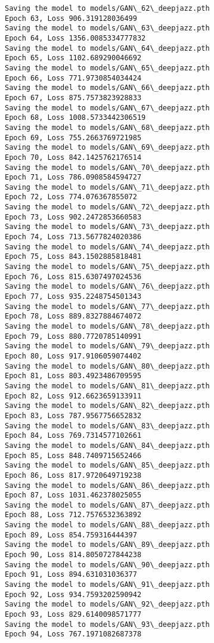 \documentclass[11pt]{article}
\begin{document}
\begin{Verbatim}[commandchars=\\\{\}]
Saving the model to models/GAN\_62\_deepjazz.pth
Epoch 63, Loss 906.319128036499
Saving the model to models/GAN\_63\_deepjazz.pth
Epoch 64, Loss 1356.0085334777832
Saving the model to models/GAN\_64\_deepjazz.pth
Epoch 65, Loss 1102.689290046692
Saving the model to models/GAN\_65\_deepjazz.pth
Epoch 66, Loss 771.9730854034424
Saving the model to models/GAN\_66\_deepjazz.pth
Epoch 67, Loss 875.7573823928833
Saving the model to models/GAN\_67\_deepjazz.pth
Epoch 68, Loss 1008.5733442306519
Saving the model to models/GAN\_68\_deepjazz.pth
Epoch 69, Loss 755.2663769721985
Saving the model to models/GAN\_69\_deepjazz.pth
Epoch 70, Loss 842.1425762176514
Saving the model to models/GAN\_70\_deepjazz.pth
Epoch 71, Loss 786.0908584594727
Saving the model to models/GAN\_71\_deepjazz.pth
Epoch 72, Loss 774.076367855072
Saving the model to models/GAN\_72\_deepjazz.pth
Epoch 73, Loss 902.2472853660583
Saving the model to models/GAN\_73\_deepjazz.pth
Epoch 74, Loss 713.5677824020386
Saving the model to models/GAN\_74\_deepjazz.pth
Epoch 75, Loss 843.1502885818481
Saving the model to models/GAN\_75\_deepjazz.pth
Epoch 76, Loss 815.6307497024536
Saving the model to models/GAN\_76\_deepjazz.pth
Epoch 77, Loss 935.2248754501343
Saving the model to models/GAN\_77\_deepjazz.pth
Epoch 78, Loss 889.8327884674072
Saving the model to models/GAN\_78\_deepjazz.pth
Epoch 79, Loss 880.7720785140991
Saving the model to models/GAN\_79\_deepjazz.pth
Epoch 80, Loss 917.9106059074402
Saving the model to models/GAN\_80\_deepjazz.pth
Epoch 81, Loss 803.4923486709595
Saving the model to models/GAN\_81\_deepjazz.pth
Epoch 82, Loss 912.6623659133911
Saving the model to models/GAN\_82\_deepjazz.pth
Epoch 83, Loss 787.9567756652832
Saving the model to models/GAN\_83\_deepjazz.pth
Epoch 84, Loss 769.7314577102661
Saving the model to models/GAN\_84\_deepjazz.pth
Epoch 85, Loss 848.7409715652466
Saving the model to models/GAN\_85\_deepjazz.pth
Epoch 86, Loss 817.9720649719238
Saving the model to models/GAN\_86\_deepjazz.pth
Epoch 87, Loss 1031.462378025055
Saving the model to models/GAN\_87\_deepjazz.pth
Epoch 88, Loss 712.7576532363892
Saving the model to models/GAN\_88\_deepjazz.pth
Epoch 89, Loss 854.759316444397
Saving the model to models/GAN\_89\_deepjazz.pth
Epoch 90, Loss 814.8050727844238
Saving the model to models/GAN\_90\_deepjazz.pth
Epoch 91, Loss 894.631031036377
Saving the model to models/GAN\_91\_deepjazz.pth
Epoch 92, Loss 934.7593202590942
Saving the model to models/GAN\_92\_deepjazz.pth
Epoch 93, Loss 829.6140098571777
Saving the model to models/GAN\_93\_deepjazz.pth
Epoch 94, Loss 767.1971082687378

\end{Verbatim}
\end{document}
